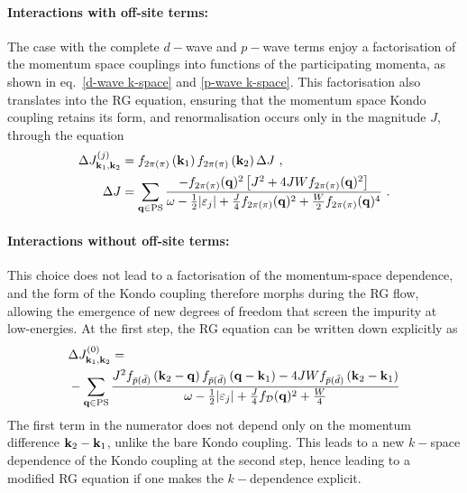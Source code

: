 \documentclass[reprint,hidelinks,onecolumn]{revtex4-2}
\begin{document}
\paragraph{Interactions with off-site terms:}
The case with the complete \(d-\)wave and \(p-\)wave terms enjoy a factorisation of the momentum space couplings into functions of the participating momenta, as shown in eq.~\ref{d-wave k-space} and \ref{p-wave k-space}. This factorisation also translates into the RG equation, ensuring that the momentum space Kondo coupling retains its form, and renormalisation occurs only in the magnitude \(J\), through the equation
\begin{equation}\begin{aligned}
	\Delta J^{(j)}_{{\bf k}_1, {\bf k}_2} &= f_{{2\pi}(\pi)}\left({\bf k}_1\right) f_{{2\pi}(\pi)}\left({\bf k}_2\right) \Delta J~,\\
\Delta J &= \sum_{{\bf q} \in \text{PS}} \frac{-f_{2\pi(\pi)}({\bf q})^2\left[J^2 + 4JWf_{2\pi(\pi)}({\bf q})^2\right]}{\omega - \frac{1}{2}|\varepsilon_j| + \frac{J}{4}f_{2\pi(\pi)}({\bf q})^2 + \frac{W}{2}f_{2\pi(\pi)}({\bf q})^4}~.
\end{aligned}\end{equation}
\paragraph{Interactions without off-site terms:}
This choice does not lead to a factorisation of the momentum-space dependence, and the form of the Kondo coupling therefore morphs during the RG flow, allowing the emergence of new degrees of freedom that screen the impurity at low-energies. At the first step, the RG equation can be written down explicitly as
\begin{equation}\begin{aligned}
	&\Delta J^{(0)}_{{\bf k}_1, {\bf k}_2} =\\
	&-\sum_{{\bf q} \in \text{PS}} \frac{J^2 f_{\bar p(\bar d)}\left({\bf k}_2 - {\bf q}\right) f_{\bar p(\bar d)}\left({\bf q} - {\bf k}_1\right) - 4JW f_{\bar p(\bar d)}\left({\bf k}_2 - {\bf k}_1\right)}{\omega - \frac{1}{2}|\varepsilon_j| + \frac{J}{4}f_\mathcal{D}({\bf q})^2 + \frac{W}{4}}
\end{aligned}\end{equation}
The first term in the numerator does not depend only on the momentum difference \({\bf k}_2 - {\bf k}_1\), unlike the bare Kondo coupling. This leads to a new \(k-\)space dependence of the Kondo coupling at the second step, hence leading to a modified RG equation if one makes the \(k-\)dependence explicit.
\end{document}
